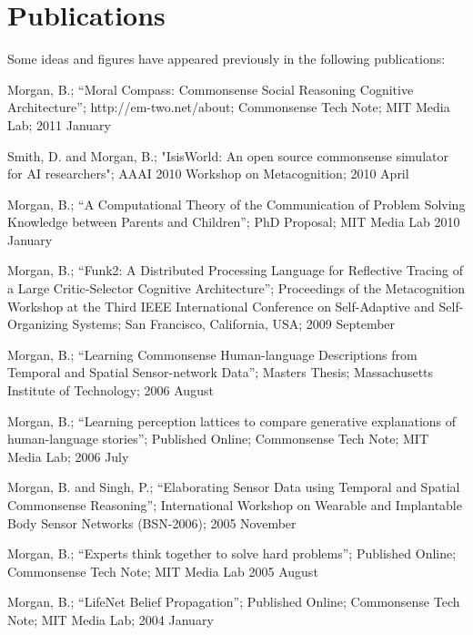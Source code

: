 \chapter*{Publications}
Some ideas and figures have appeared previously in the following publications:

\bigskip

\noindent Morgan, B.; ``Moral Compass: Commonsense Social Reasoning
 Cognitive Architecture''; http://em-two.net/about; Commonsense Tech
 Note; MIT Media Lab; 2011 January

\vspace{5mm}

\noindent Smith, D. and Morgan, B.; "IsisWorld: An open source
 commonsense simulator for AI researchers"; AAAI 2010 Workshop on
 Metacognition; 2010 April

\vspace{5mm}

\noindent Morgan, B.; ``A Computational Theory of the Communication of
 Problem Solving Knowledge between Parents and Children''; PhD
 Proposal; MIT Media Lab 2010 January

\vspace{5mm}

\noindent Morgan, B.; ``Funk2: A Distributed Processing Language for 
 Reflective Tracing of a Large Critic-Selector Cognitive
 Architecture''; Proceedings of the Metacognition Workshop at the
 Third IEEE International Conference on Self-Adaptive and
 Self-Organizing Systems; San Francisco, California, USA; 2009
 September

\vspace{5mm}

\noindent Morgan, B.; ``Learning Commonsense Human-language Descriptions
 from Temporal and Spatial Sensor-network Data''; Masters Thesis;
 Massachusetts Institute of Technology; 2006 August

\vspace{5mm}

\noindent Morgan, B.; ``Learning perception lattices to compare
 generative explanations of human-language stories''; Published
 Online; Commonsense Tech Note; MIT Media Lab; 2006 July

\vspace{5mm}

\noindent Morgan, B. and Singh, P.; ``Elaborating Sensor Data using
 Temporal and Spatial Commonsense Reasoning''; International Workshop
 on Wearable and Implantable Body Sensor Networks (BSN-2006); 2005
 November

\vspace{5mm}

\noindent Morgan, B.; ``Experts think together to solve hard problems'';
 Published Online; Commonsense Tech Note; MIT Media Lab 2005 August

\vspace{5mm}

\noindent Morgan, B.; ``LifeNet Belief Propagation''; Published Online;
 Commonsense Tech Note; MIT Media Lab; 2004 January
